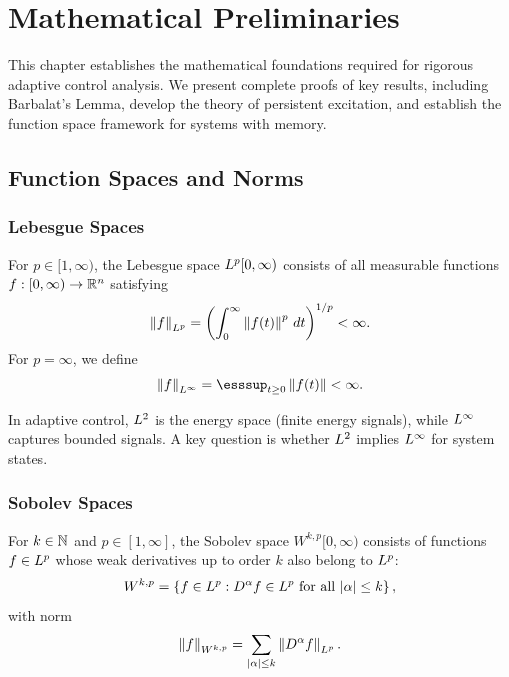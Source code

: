 \chapter{Mathematical Preliminaries}
\label{ch:preliminaries}

This chapter establishes the mathematical foundations required for rigorous adaptive control analysis. We present complete proofs of key results, including Barbalat's Lemma, develop the theory of persistent excitation, and establish the function space framework for systems with memory.

\section{Function Spaces and Norms}

\subsection{Lebesgue Spaces}

\begin{definition}[$\Lp{p}$ Spaces]
For $p \in [1, \infty)$, the Lebesgue space $L^{p}[0,\infty)$ consists of all measurable functions $f: [0,\infty) \to \mathbb{R}^n$ satisfying
\begin{equation}
    \left\| f \right\|_{L^{p}} = \left( \int_0^\infty \left\| f(t) \right\|^p \, dt \right)^{1/p} < \infty.
\end{equation}
For $p = \infty$, we define
\begin{equation}
    \norm{f}_{\Lp{\infty}} = \esssup_{t \geq 0} \norm{f(t)} < \infty.
\end{equation}
\end{definition}

\begin{remark}
In adaptive control, $L^{2}$ is the energy space (finite energy signals), while $L^{\infty}$ captures bounded signals. A key question is whether $L^{2}$ implies $L^{\infty}$ for system states.
\end{remark}

\subsection{Sobolev Spaces}

\begin{definition}
For $k \in \mathbb{N}$ and $p \in [1,\infty]$, the Sobolev space $W^{k,p}[0,\infty)$ consists of functions $f \in L^{p}$ whose weak derivatives up to order $k$ also belong to $\Lp{p}$:
\begin{equation}
    W^{k,p} = \left\{ f \in L^{p} : D^\alpha f \in L^{p} \text{ for all } |\alpha| \leq k \right\},
\end{equation}
with norm
\begin{equation}
    \left\| f \right\|_{W^{k,p}} = \sum_{|\alpha| \leq k} \left\| D^\alpha f \right\|_{L^{p}}.
\end{equation}
\end{definition}

